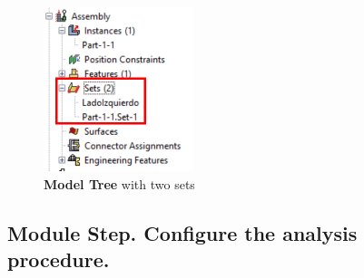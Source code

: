 \begin{enumerate}
  \begin{figure}
    \centering
    \includegraphics[width=0.39\textwidth]{./body/images/imagen28.pdf}
    \caption{\textbf{Model Tree} with two sets}
    \label{figu28}
  \end{figure}
\end{enumerate}
\newpage
\subsection{Module Step. Configure the analysis procedure.}

